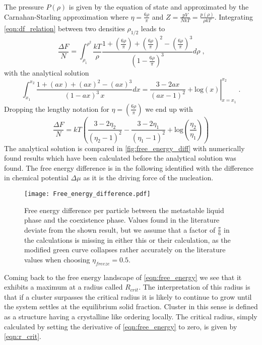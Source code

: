 The pressure $P(\rho)$ is given by the equation of state and approximated by the Carnahan-Starling approximation where $\eta = \frac{6 \rho }{\pi}$ and $Z=\frac{pV}{NkT} = \frac{p(\rho)}{\rho kT}$. Integrating \autoref{eqn:df_relation} between two densities $\rho_{1/2}$ leads to
\begin{equation}
\frac{\Delta F}{N} = \int_{\rho_1}^{\rho^2} \frac{kT}{\rho} \frac{1+\left( \frac{6 \rho}{\pi}\right) +\left( \frac{6 \rho}{\pi}\right)^2 - \left( \frac{6 \rho}{\pi}\right)^3}{\left( 1 - \frac{6 \rho}{\pi}\right)^3} d\rho \; \text{,}
\end{equation}
with the analytical solution
\begin{equation}
\int_{x_1}^{x_2} \frac{1+(ax) +(ax)^2 - (ax)^3 }{( 1 - ax )^3 \,  x} dx = \left. \frac{3-2ax}{(ax-1)^2} + \text{log}(x) \right|_{x=x_1}^{x_2} \; \text{.}
\end{equation}
Dropping the lengthy notation for $\eta = \left( \frac{6 \rho}{\pi}\right)$ we end up with
\begin{equation}
\frac{\Delta F}{N} = kT \left(  \frac{3-2 \eta_2}{(\eta_2 - 1)^2} - \frac{3-2 \eta_1}{(\eta_1 - 1)^2} + \text{log}\left( \frac{\eta_2}{\eta_1} \right) \right)
\end{equation}
The analytical solution is compared in \autoref{fig:free_energy_diff} with numerically found results which have been calculated before the analytical solution was found. The free energy difference is in the following identified with the difference in chemical potential $\Delta \mu$ as it is the driving force of the nucleation.  \\

\begin{figure}[h]
\centering
\texttt{[image: Free\_energy\_difference.pdf]}
\caption[Free energy difference between fluid and solid phase]{Free energy difference per particle between the metastable liquid phase and the coexistence phase. Values found in the literature deviate from the shown result, but we assume that a factor of $\frac{\pi}{6}$ in the calculations is missing in either this or their calculation, as the modified green curve collapses rather accurately on the literature values when choosing $\eta_{freeze}=0.5$.}
\label{fig:free_energy_diff}
\end{figure}


Coming back to the free energy landscape of \autoref{eqn:free_energy} we see that it exhibits a maximum at a radius called $R_{crit}$. The interpretation of this radius is that if a cluster surpasses the critical radius it is likely to continue to grow until the system settles at the equilibrium solid fraction. Cluster in this sense is defined as a structure having a crystalline like ordering locally. The critical radius, simply calculated by setting the derivative of \autoref{eqn:free_energy} to zero, is given by \autoref{eqn:r_crit}.

